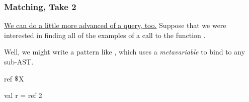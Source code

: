 \documentclass[aspectratio=169, handout]{beamer}
\newcommand{\dollar}{\mbox{\textdollar}}
\begin{document}
\begin{frame}[fragile]
  \frametitle{Matching, Take 2}

  \begin{center}
    \begin{minipage}[t][0.21\textheight][t]{\textwidth}
      \raggedright
      {\color{blue}\href{https://semgrep.dev/playground/s/07Ob}{We can do a little more advanced of a query, too.}} Suppose that we were
      interested in finding all of the examples of a call to the function
      .

      \vspace{5pt}

      Well, we might write a pattern like \code{ref $\,\,\dollar$X}, which uses a
      \textit{metavariable} to bind to any sub-AST.
    \end{minipage}
    \begin{minipage}[t][0.515\textheight][t]{\textwidth}
      \begin{minipage}{0.48\textwidth}
        \centering
      \end{minipage}
      \begin{minipage}{0.48\textwidth}
        \centering
      \end{minipage}
    \end{minipage}
    \begin{minipage}[t][0.3\textheight][t]{\textwidth}
      \begin{minipage}{0.48\textwidth}
        \centering
        \begin{codeblock}
          ref $\dollar$X
        \end{codeblock}
      \end{minipage}
      \begin{minipage}{0.48\textwidth}
        \begin{codeblock}
          val r = ref 2
        \end{codeblock}
      \end{minipage}
    \end{minipage}
  \end{center}
\end{frame}
\end{document}
